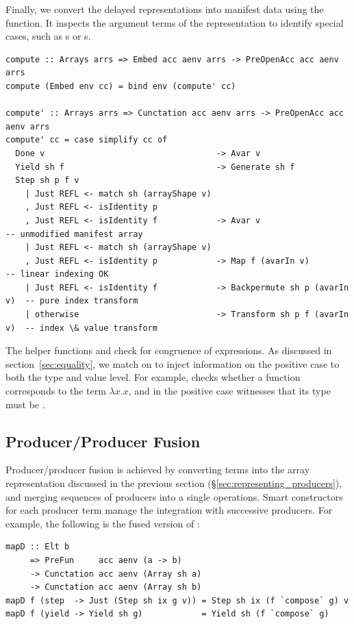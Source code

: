 Finally, we convert the delayed representations into manifest data using the
 function. It inspects the argument terms of the representation to
identify special cases, such as s or s.
%
\begin{lstlisting}[style=haskell
    ,label=lst:compute
    ,caption={Computing the delayed representation to a manifest array}]
compute :: Arrays arrs => Embed acc aenv arrs -> PreOpenAcc acc aenv arrs
compute (Embed env cc) = bind env (compute' cc)

compute' :: Arrays arrs => Cunctation acc aenv arrs -> PreOpenAcc acc aenv arrs
compute' cc = case simplify cc of
  Done v                                   -> Avar v
  Yield sh f                               -> Generate sh f
  Step sh p f v
    | Just REFL <- match sh (arrayShape v)
    , Just REFL <- isIdentity p
    , Just REFL <- isIdentity f            -> Avar v                       -- unmodified manifest array
    | Just REFL <- match sh (arrayShape v)
    , Just REFL <- isIdentity p            -> Map f (avarIn v)             -- linear indexing OK
    | Just REFL <- isIdentity f            -> Backpermute sh p (avarIn v)  -- pure index transform
    | otherwise                            -> Transform sh p f (avarIn v)  -- index \& value transform
\end{lstlisting}

The helper functions  and  check for congruence of
expressions. As discussed in section~\ref{sec:equality}, we match on  to inject information on the positive case to both the type and value
level. For example,  checks whether a function corresponds to
the term $\lambda x.x$, and in the positive case witnesses that its type must be
.


\subsection{Producer/Producer Fusion}
\label{sec:producer_producer_fusion}

Producer/producer fusion is achieved by converting terms into the array
representation discussed in the previous section
(\S\ref{sec:representing_producers}), and merging sequences of producers into a
single operations. Smart constructors for each producer term manage the
integration with successive producers. For example, the following is the fused
version of :
%
\begin{lstlisting}[style=haskell,
    caption={Fused definition of the \code{map} operation},
    label=lst:mapD]
mapD :: Elt b
     => PreFun     acc aenv (a -> b)
     -> Cunctation acc aenv (Array sh a)
     -> Cunctation acc aenv (Array sh b)
mapD f (step  -> Just (Step sh ix g v)) = Step sh ix (f `compose` g) v
mapD f (yield -> Yield sh g)            = Yield sh (f `compose` g)
\end{lstlisting}

